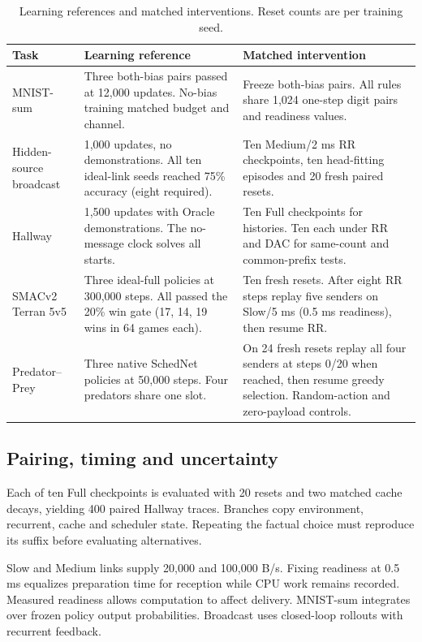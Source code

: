 \documentclass[pdflatex,sn-mathphys-num]{sn-jnl}
\begin{document}
\begin{table}[htbp]\centering\normalsize
\caption{Learning references and matched interventions. Reset counts are per training seed.}\label{tab:cohorts}
\begin{tabularx}{\textwidth}{@{}>{\RaggedRight\arraybackslash}p{}XX@{}}
\toprule
Task & Learning reference & Matched intervention\\
\midrule
MNIST-sum & Three both-bias pairs passed at 12,000 updates. No-bias training matched budget and channel. & Freeze both-bias pairs. All rules share 1,024 one-step digit pairs and readiness values.\\[2pt]
Hidden-source broadcast & 1,000 updates, no demonstrations. All ten ideal-link seeds reached 75\% accuracy (eight required). & Ten Medium/2 ms RR checkpoints, ten head-fitting episodes and 20 fresh paired resets.\\[2pt]
Hallway & 1,500 updates with Oracle demonstrations. The no-message clock solves all starts. & Ten Full checkpoints for histories. Ten each under RR and DAC for same-count and common-prefix tests.\\[2pt]
SMACv2 Terran 5v5 & Three ideal-full policies at 300,000 steps. All passed the 20\% win gate (17, 14, 19 wins in 64 games each). & Ten fresh resets. After eight RR steps replay five senders on Slow/5 ms (0.5 ms readiness), then resume RR.\\[2pt]
Predator--Prey & Three native SchedNet policies at 50,000 steps. Four predators share one slot. & On 24 fresh resets replay all four senders at steps 0/20 when reached, then resume greedy selection. Random-action and zero-payload controls.\\
\bottomrule
\end{tabularx}
\end{table}

\subsection{Pairing, timing and uncertainty}
Each of ten Full checkpoints is evaluated with 20 resets and two matched cache decays, yielding 400 paired Hallway traces. Branches copy environment, recurrent, cache and scheduler state. Repeating the factual choice must reproduce its suffix before evaluating alternatives.

Slow and Medium links supply 20,000 and 100,000 B/s. Fixing readiness at 0.5 ms equalizes preparation time for reception while CPU work remains recorded. Measured readiness allows computation to affect delivery. MNIST-sum integrates over frozen policy output probabilities. Broadcast uses closed-loop rollouts with recurrent feedback.
\end{document}

